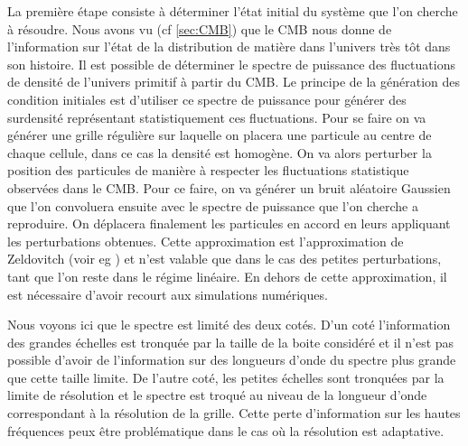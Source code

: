 La première étape consiste à déterminer l'état initial du système que l'on cherche à résoudre.
Nous avons vu (cf \ref{sec:CMB}) que le \ac{CMB} nous donne de l'information sur l'état de la distribution de matière dans l'univers très tôt dans son histoire.
Il est possible de déterminer le spectre de puissance des fluctuations de densité de l'univers primitif à partir du \ac{CMB}.
Le principe de la génération des condition initiales est d'utiliser ce spectre de puissance pour générer des surdensité représentant statistiquement ces fluctuations.
Pour se faire on va générer une grille régulière sur laquelle on placera une particule au centre de chaque cellule, dans ce cas la densité est homogène.
On va alors perturber la position des particules de manière à respecter les fluctuations statistique observées dans le \ac{CMB}.
Pour ce faire, on va générer un bruit aléatoire Gaussien que l'on 
convoluera ensuite avec le spectre de puissance que l'on cherche a reproduire.
On déplacera finalement les particules en accord en leurs appliquant les perturbations obtenues. 
Cette approximation est l’approximation de Zeldovitch (voir eg \cite{2014MNRAS.439.3630W}) et n'est valable que dans le cas des petites perturbations, tant que l'on reste dans le régime linéaire.
En dehors de cette approximation, il est nécessaire d'avoir recourt aux simulations numériques.

Nous voyons ici que le spectre est limité des deux cotés.
D'un coté l'information des grandes échelles est tronquée par la taille de la boite considéré et il n'est pas possible d'avoir de l’information sur des longueurs d'onde du spectre plus grande que cette taille limite.
De l'autre coté, les petites échelles sont tronquées par la limite de résolution et le spectre est troqué au niveau de la longueur d'onde correspondant à la résolution de la grille.
Cette perte d'information sur les hautes fréquences peux être problématique dans le cas où la résolution est adaptative.

